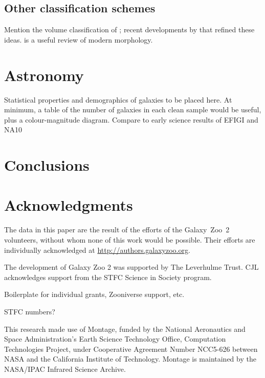\documentclass[useAMS,usenatbib]{mn2e}
\begin{document}
\subsection{Other classification schemes}

Mention the volume classification of \citet{dev59}; recent developments by \citet{kor12,lau11,cap11,kra11} that refined these ideas. \citet{but11} is a useful review of modern morphology. 


\section{Astronomy}\label{sec-astronomy}

Statistical properties and demographics of galaxies to be placed here. At minimum, a table of the number of galaxies in each clean sample would be useful, plus a colour-magnitude diagram. Compare to early science results of EFIGI \citep{del11a} and NA10 \citep{nai10a,nai10b}


\section{Conclusions}\label{sec-conclusion}


\section*{Acknowledgments}
The data in this paper are the result of the efforts of the Galaxy~Zoo~2 volunteers, without whom none of this work would be possible. Their efforts are individually acknowledged at \url{http://authors.galaxyzoo.org}. 

The development of Galaxy Zoo 2 was supported by The Leverhulme Trust. CJL acknowledges support from the STFC Science in Society program. 

Boilerplate for individual grants, Zooniverse support, etc.

STFC numbers?

This research made use of Montage, funded by the National Aeronautics and Space Administration's Earth Science Technology Office, Computation Technologies Project, under Cooperative Agreement Number NCC5-626 between NASA and the California Institute of Technology. Montage is maintained by the NASA/IPAC Infrared Science Archive.
\end{document}
